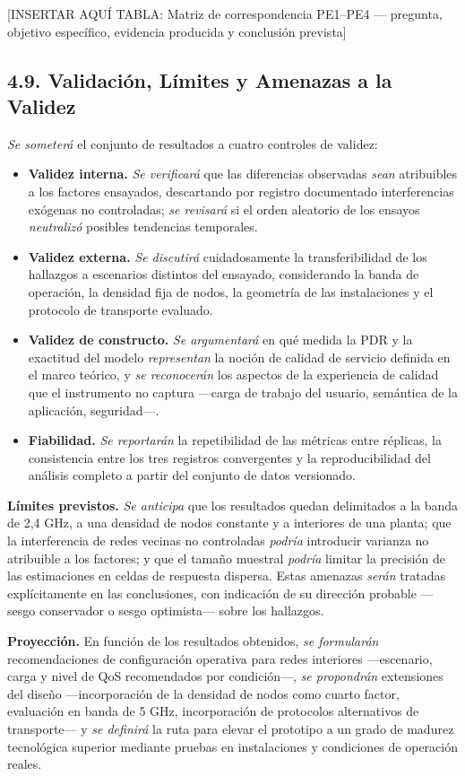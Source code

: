 \documentclass[
  12pt,
]{article}
\providecommand{\tightlist}{%
  \setlength{\itemsep}{0pt}\setlength{\parskip}{0pt}}
\begin{document}
{[}INSERTAR AQUÍ TABLA: Matriz de correspondencia PE1–PE4 — pregunta,
objetivo específico, evidencia producida y conclusión prevista{]}

\subsection{4.9. Validación, Límites y Amenazas a la
Validez}\label{validaciuxf3n-luxedmites-y-amenazas-a-la-validez}

\emph{Se someterá} el conjunto de resultados a cuatro controles de
validez:

\begin{itemize}
\tightlist
\item
  \textbf{Validez interna.} \emph{Se verificará} que las diferencias
  observadas \emph{sean} atribuibles a los factores ensayados,
  descartando por registro documentado interferencias exógenas no
  controladas; \emph{se revisará} si el orden aleatorio de los ensayos
  \emph{neutralizó} posibles tendencias temporales.
\item
  \textbf{Validez externa.} \emph{Se discutirá} cuidadosamente la
  transferibilidad de los hallazgos a escenarios distintos del ensayado,
  considerando la banda de operación, la densidad fija de nodos, la
  geometría de las instalaciones y el protocolo de transporte evaluado.
\item
  \textbf{Validez de constructo.} \emph{Se argumentará} en qué medida la
  PDR y la exactitud del modelo \emph{representan} la noción de calidad
  de servicio definida en el marco teórico, y \emph{se reconocerán} los
  aspectos de la experiencia de calidad que el instrumento no captura
  —carga de trabajo del usuario, semántica de la aplicación, seguridad—.
\item
  \textbf{Fiabilidad.} \emph{Se reportarán} la repetibilidad de las
  métricas entre réplicas, la consistencia entre los tres registros
  convergentes y la reproducibilidad del análisis completo a partir del
  conjunto de datos versionado.
\end{itemize}

\textbf{Límites previstos.} \emph{Se anticipa} que los resultados quedan
delimitados a la banda de 2,4 GHz, a una densidad de nodos constante y a
interiores de una planta; que la interferencia de redes vecinas no
controladas \emph{podría} introducir varianza no atribuible a los
factores; y que el tamaño muestral \emph{podría} limitar la precisión de
las estimaciones en celdas de respuesta dispersa. Estas amenazas
\emph{serán} tratadas explícitamente en las conclusiones, con indicación
de su dirección probable —sesgo conservador o sesgo optimista— sobre los
hallazgos.

\textbf{Proyección.} En función de los resultados obtenidos, \emph{se
formularán} recomendaciones de configuración operativa para redes
interiores —escenario, carga y nivel de QoS recomendados por condición—,
\emph{se propondrán} extensiones del diseño —incorporación de la
densidad de nodos como cuarto factor, evaluación en banda de 5 GHz,
incorporación de protocolos alternativos de transporte— y \emph{se
definirá} la ruta para elevar el prototipo a un grado de madurez
tecnológica superior mediante pruebas en instalaciones y condiciones de
operación reales.
\end{document}
